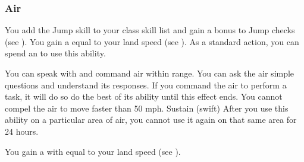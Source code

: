         \subsubsection{Air}
             You add the Jump skill to your class skill list and gain a  bonus to Jump checks (see ).
             You gain a  equal to your land speed (see ).
             As a standard action, you can spend an  to use this ability.
            \begin{ability}
                \begin{spelltargetinginfo}
                    \spellrng{\rnglong}
                \end{spelltargetinginfo}
                \begin{spelleffects}
                    \spelleffect You can speak with and command air within range.
                    You can ask the air simple questions and understand its responses.
                    If you command the air to perform a task, it will do so do the best of its ability until this effect ends.
                    You cannot compel the air to move faster than 50 mph.
                    \spelldur Sustain (swift)
                    \spellspecial After you use this ability on a particular area of air, you cannot use it again on that same area for 24 hours.
                \end{spelleffects}
            \end{ability}
             You gain a  with  equal to your land speed (see ).

